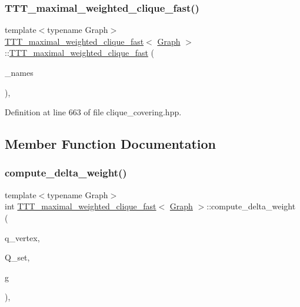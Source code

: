 \subsubsection{\texorpdfstring{T\+T\+T\+\_\+maximal\+\_\+weighted\+\_\+clique\+\_\+fast()}{TTT\_maximal\_weighted\_clique\_fast()}}
{\footnotesize\ttfamily template$<$typename Graph$>$ \\
\hyperlink{classTTT__maximal__weighted__clique__fast}{T\+T\+T\+\_\+maximal\+\_\+weighted\+\_\+clique\+\_\+fast}$<$ \hyperlink{structGraph}{Graph} $>$\+::\hyperlink{classTTT__maximal__weighted__clique__fast}{T\+T\+T\+\_\+maximal\+\_\+weighted\+\_\+clique\+\_\+fast} (\begin{DoxyParamCaption}\item[{std\+::map$<$ typename boost\+::graph\+\_\+traits$<$ \hyperlink{structGraph}{Graph} $>$\+::vertex\+\_\+descriptor, std\+::string $>$ \&}]{\+\_\+names }\end{DoxyParamCaption})\hspace{0.3cm}{\ttfamily [inline]}, {\ttfamily [explicit]}}



Definition at line 663 of file clique\+\_\+covering.\+hpp.



\subsection{Member Function Documentation}
\mbox{\label{classTTT__maximal__weighted__clique__fast_a19a07874e7cf7bb56bdbab98498a92a8}} 
\subsubsection{\texorpdfstring{compute\+\_\+delta\+\_\+weight()}{compute\_delta\_weight()}}
{\footnotesize\ttfamily template$<$typename Graph$>$ \\
int \hyperlink{classTTT__maximal__weighted__clique__fast}{T\+T\+T\+\_\+maximal\+\_\+weighted\+\_\+clique\+\_\+fast}$<$ \hyperlink{structGraph}{Graph} $>$\+::compute\+\_\+delta\+\_\+weight (\begin{DoxyParamCaption}\item[{\hyperlink{classTTT__maximal__weighted__clique__fast_a55ca1f8931415f7338827925b86c218d}{vertex}}]{q\+\_\+vertex,  }\item[{\hyperlink{classCustomUnorderedSet}{Custom\+Unordered\+Set}$<$ \hyperlink{classTTT__maximal__weighted__clique__fast_a55ca1f8931415f7338827925b86c218d}{vertex} $>$}]{Q\+\_\+set,  }\item[{const \hyperlink{structGraph}{Graph} \&}]{g }\end{DoxyParamCaption})\hspace{0.3cm}{\ttfamily [inline]}, {\ttfamily [private]}}



